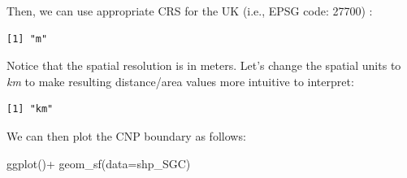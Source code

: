\documentclass[
  letterpaper,
  DIV=11,
  numbers=noendperiod]{scrartcl}
\newenvironment{Shaded}{\begin{snugshade}}{\end{snugshade}}
\newcommand{\AttributeTok}[1]{\textcolor[rgb]{0.40,0.45,0.13}{#1}}
\newcommand{\DecValTok}[1]{\textcolor[rgb]{0.68,0.00,0.00}{#1}}
\newcommand{\FunctionTok}[1]{\textcolor[rgb]{0.28,0.35,0.67}{#1}}
\newcommand{\NormalTok}[1]{\textcolor[rgb]{0.00,0.23,0.31}{#1}}
\newcommand{\OtherTok}[1]{\textcolor[rgb]{0.00,0.23,0.31}{#1}}
\newcommand{\SpecialCharTok}[1]{\textcolor[rgb]{0.37,0.37,0.37}{#1}}
\newcommand{\StringTok}[1]{\textcolor[rgb]{0.13,0.47,0.30}{#1}}
\begin{document}
Then, we can use appropriate CRS for the UK (i.e., EPSG code: 27700) :

\begin{Shaded}
\end{Shaded}

\begin{verbatim}
[1] "m"
\end{verbatim}

Notice that the spatial resolution is in meters. Let's change the
spatial units to \emph{km} to make resulting distance/area values more
intuitive to interpret:

\begin{Shaded}
\end{Shaded}

\begin{verbatim}
[1] "km"
\end{verbatim}

We can then plot the CNP boundary as follows:

\begin{Shaded}
\begin{Highlighting}[]
\FunctionTok{ggplot}\NormalTok{()}\SpecialCharTok{+}
  \FunctionTok{geom\_sf}\NormalTok{(}\AttributeTok{data=}\NormalTok{shp\_SGC)}
\end{Highlighting}
\end{Shaded}
\end{document}
